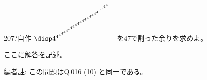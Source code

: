 \begin{thm}{207}{\hosi ?}{自作}
 $\disp 4^{4^{4^{4^{4^{4^{4^{4^{4^{4^{4^{4^{4^{4^{4^{4^{4^{4^{4^{\cdot^{\cdot^{\cdot^{4^{4}}}}}}}}}}}}}}}}}}}}}}}$を47で割った余りを求めよ。\\
\end{thm}

ここに解答を記述。

編者註: この問題はQ.016 (10) と同一である。